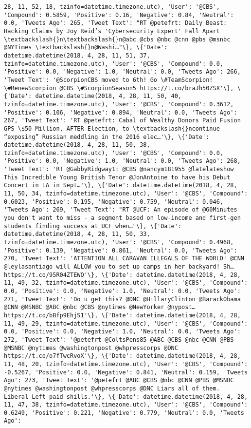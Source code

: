 \documentclass[11pt]{article}
\begin{document}
\begin{Verbatim}[commandchars=\\\{\}]
28, 11, 52, 18, tzinfo=datetime.timezone.utc), 'User': '@CBS', 'Compound': 0.5859, 'Positive': 0.16, 'Negative': 0.84, 'Neutral': 0.0, 'Tweets Ago': 265, 'Tweet Text': "RT @petefrt: Daily Beast: Hacking Claims by Joy Reid’s 'Cybersecurity Expert' Fall Apart \textbackslash{}n\textbackslash{}n@abc @cbs @nbc @cnn @pbs @msnbc @NYTimes \textbackslash{}n@Washi…"\}, \{'Date': datetime.datetime(2018, 4, 28, 11, 51, 37, tzinfo=datetime.timezone.utc), 'User': '@CBS', 'Compound': 0.0, 'Positive': 0.0, 'Negative': 1.0, 'Neutral': 0.0, 'Tweets Ago': 266, 'Tweet Text': '@ScorpionCBS moved to 6th! Go \#TeamScorpion! \#RenewScorpion @CBS \#ScorpionSeason5 https://t.co/braJh50ZSX'\}, \{'Date': datetime.datetime(2018, 4, 28, 11, 50, 40, tzinfo=datetime.timezone.utc), 'User': '@CBS', 'Compound': 0.3612, 'Positive': 0.106, 'Negative': 0.894, 'Neutral': 0.0, 'Tweets Ago': 267, 'Tweet Text': 'RT @petefrt: Cabal of Wealthy Donors Paid Fusion GPS \$50 Million, AFTER Election, to \textbackslash{}ncontinue “exposing” Russian meddling in the 2016 elec…'\}, \{'Date': datetime.datetime(2018, 4, 28, 11, 50, 38, tzinfo=datetime.timezone.utc), 'User': '@CBS', 'Compound': 0.0, 'Positive': 0.0, 'Negative': 1.0, 'Neutral': 0.0, 'Tweets Ago': 268, 'Tweet Text': 'RT @GabbyRidgway1: @CBS @nancym181955 @latelateshow This Incredible Young British Tenor @JonAntoine to have his Debut Concert in LA in Sept…'\}, \{'Date': datetime.datetime(2018, 4, 28, 11, 50, 34, tzinfo=datetime.timezone.utc), 'User': '@CBS', 'Compound': 0.6023, 'Positive': 0.195, 'Negative': 0.759, 'Neutral': 0.046, 'Tweets Ago': 269, 'Tweet Text': "RT @UCF: An episode of @60Minutes you don't want to miss - a segment based on low-income and first-gen students finding success at UCF when…"\}, \{'Date': datetime.datetime(2018, 4, 28, 11, 50, 33, tzinfo=datetime.timezone.utc), 'User': '@CBS', 'Compound': 0.4968, 'Positive': 0.139, 'Negative': 0.861, 'Neutral': 0.0, 'Tweets Ago': 270, 'Tweet Text': 'ATTENTION ALL CARAVAN ILLEGALS OF THE WORLD! @CNN @leylasantiago will ALLOW you to set up camps in her backyard! Sh… https://t.co/95R04ZTEWQ'\}, \{'Date': datetime.datetime(2018, 4, 28, 11, 49, 32, tzinfo=datetime.timezone.utc), 'User': '@CBS', 'Compound': 0.0, 'Positive': 0.0, 'Negative': 1.0, 'Neutral': 0.0, 'Tweets Ago': 271, 'Tweet Text': 'Do u get this? @DNC @HillaryClinton @BarackObama @CNN @MSNBC @ABC @nbc @CBS @nytimes @NewYorker @nypost… https://t.co/bBfp9EhjS1'\}, \{'Date': datetime.datetime(2018, 4, 28, 11, 49, 29, tzinfo=datetime.timezone.utc), 'User': '@CBS', 'Compound': 0.0, 'Positive': 0.0, 'Negative': 1.0, 'Neutral': 0.0, 'Tweets Ago': 272, 'Tweet Text': '@petefrt @ColtsPens85 @ABC @CBS @nbc @CNN @PBS @MSNBC @nytimes @washingtonpost @whpresscorps @DNC  https://t.co/o7fTwcRvoX'\}, \{'Date': datetime.datetime(2018, 4, 28, 11, 48, 20, tzinfo=datetime.timezone.utc), 'User': '@CBS', 'Compound': -0.5267, 'Positive': 0.0, 'Negative': 0.841, 'Neutral': 0.159, 'Tweets Ago': 273, 'Tweet Text': '@petefrt @ABC @CBS @nbc @CNN @PBS @MSNBC @nytimes @washingtonpost @whpresscorps @DNC Liars all of them.  Liberal Left paid shills.'\}, \{'Date': datetime.datetime(2018, 4, 28, 11, 47, 38, tzinfo=datetime.timezone.utc), 'User': '@CBS', 'Compound': 0.6249, 'Positive': 0.221, 'Negative': 0.779, 'Neutral': 0.0, 'Tweets Ago': 
\end{Verbatim}
\end{document}
